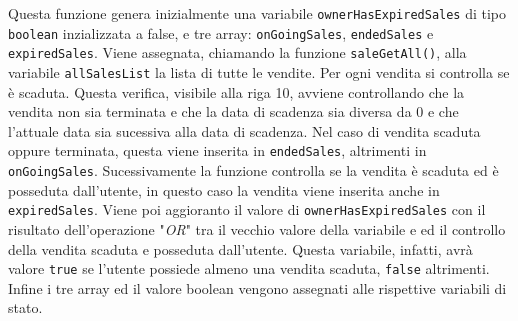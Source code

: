 \documentclass[a4paper]{article}
\begin{document}
        Questa funzione genera inizialmente una variabile \verb|ownerHasExpiredSales| di tipo \verb|boolean| inzializzata a false, e tre array: \verb|onGoingSales|, \verb|endedSales| e \verb|expiredSales|.
        Viene assegnata, chiamando la funzione \verb|saleGetAll()|, alla variabile \verb|allSalesList| la lista di tutte le vendite. Per ogni vendita si controlla se è scaduta. Questa verifica, visibile alla riga 10, avviene controllando
        che la vendita non sia terminata e che la data di scadenza sia diversa da 0 e che l'attuale data sia sucessiva alla data di scadenza. Nel caso di vendita scaduta oppure terminata, questa viene inserita in \verb|endedSales|, altrimenti
        in \verb|onGoingSales|. Sucessivamente la funzione controlla se la vendita è scaduta ed è posseduta dall'utente, in questo caso la vendita viene inserita anche in \verb|expiredSales|. Viene poi aggioranto il valore di \verb|ownerHasExpiredSales|
        con il risultato dell'operazione "\emph{OR}" tra il vecchio valore della variabile e ed il controllo della vendita scaduta e posseduta dall'utente. Questa variabile, infatti, avrà valore \verb|true| se l'utente possiede almeno una vendita scaduta, \verb|false| altrimenti.
        Infine i tre array ed il valore boolean vengono assegnati alle rispettive variabili di stato.
\end{document}
